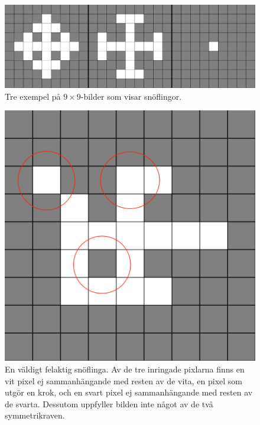 \begin{centering}
    \begin{figure}[h]
        \centering
        \includegraphics[scale=0.1]{all_valid_examples.png}
        \caption{Tre exempel på $9\times 9$-bilder som visar snöflingor.}
        \label{fig:enter-label}
    \end{figure}
\end{centering}

\begin{centering}
    \begin{figure}[h]
        \centering
        \includegraphics[scale=0.1]{invalid_example.png}
        \caption{En väldigt felaktig snöflinga. Av de tre inringade pixlarna finns en vit pixel ej sammanhängande med resten av de vita, en pixel som utgör en krok, och en svart pixel ej sammanhängande med resten av de svarta. Dessutom uppfyller bilden inte något av de två symmetrikraven.}
        \label{fig:enter-label}
    \end{figure}
\end{centering}

